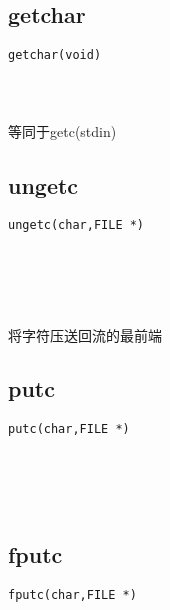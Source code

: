 \documentclass[10pt,a4paper]{article}
\begin{document}
\subsection{getchar}
\begin{spacing}{2.0}
\lstset{language=C,numbers=none}
\begin{lstlisting}
getchar(void)
\end{lstlisting}
{\large\color[rgb]{0.2,0.4,0.6}{void:}}
\paragraph{ \ \ }等同于getc(stdin)
\end{spacing}

\subsection{ungetc}
\begin{spacing}{2.0}
\lstset{language=C,numbers=none}
\begin{lstlisting}
ungetc(char,FILE *)
\end{lstlisting}
{\large\color[rgb]{0.2,0.4,0.6}{char:}} \\
{\large\color[rgb]{0.2,0.4,0.6}{*:}}
\paragraph{ \ \ }将字符压送回流的最前端
\end{spacing}

\subsection{putc}
\begin{spacing}{2.0}
\lstset{language=C,numbers=none}
\begin{lstlisting}
putc(char,FILE *)
\end{lstlisting}
{\large\color[rgb]{0.2,0.4,0.6}{char:}} \\
{\large\color[rgb]{0.2,0.4,0.6}{*:}}
\paragraph{ \ \ }
\end{spacing}

\subsection{fputc}
\begin{spacing}{2.0}
\lstset{language=C,numbers=none}
\begin{lstlisting}
fputc(char,FILE *)
\end{lstlisting}
{\large\color[rgb]{0.2,0.4,0.6}{char:}} \\
{\large\color[rgb]{0.2,0.4,0.6}{*:}}
\paragraph{ \ \ }
\end{spacing}
\end{document}
